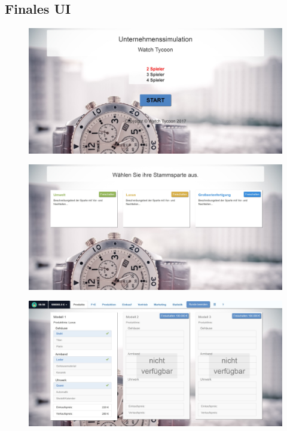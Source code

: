 \subsection{Finales UI}
\begin{figure} [h]
	\centering
	\includegraphics[scale=0.1]{img/bilder_layout/Spiel1.jpg} 
\end{figure}
\begin{figure} [h]
	\centering
	\includegraphics[scale=0.1]{img/bilder_layout/Spiel2.jpg} 
\end{figure}
\begin{figure} 
	\centering
	\includegraphics[scale=0.1]{img/bilder_layout/Spiel3.jpg} 
\end{figure}
